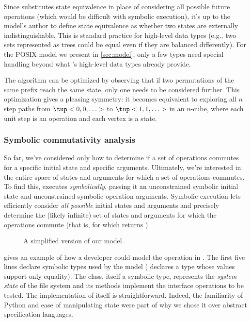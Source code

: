 Since  substitutes state equivalence in place of
considering all possible future operations (which would be difficult
with symbolic execution), it's up to the model's author to define
state equivalence as whether two states are externally
indistinguishable.  This is standard practice for high-level data
types (e.g., two sets represented as trees could be equal even if they
are balanced differently).  For the POSIX model we present in
\cref{sec:model}, only a few types need special handling beyond what
\analyzer's high-level data types already provide.

The  algorithm can be optimized by observing that if
two permutations of the same prefix reach the same state, only one
needs to be considered further.  This optimization gives
 a pleasing symmetry: it becomes equivalent to
exploring all $n$ step paths from $\tup<0,0,\ldots>$ to
$\tup<1,1,\ldots>$ in an $n$-cube, where each unit step is an
operation and each vertex is a state.


\subsubsection{Symbolic commutativity analysis}

So far, we've considered only how to determine if a set of operations
commutes for a specific initial state and specific arguments.
Ultimately, we're interested in the entire space of states and
arguments for which a set of operations commutes.  To find this,
\analyzer executes  \emph{symbolically}, passing it an
unconstrained symbolic initial state and unconstrained symbolic
operation arguments.  Symbolic execution lets \analyzer efficiently
consider \emph{all possible} initial states and arguments and
precisely determine the (likely infinite) set of states and arguments
for which the operations commute (that is, for which 
returns ).

\begin{figure}
  \caption{A simplified version of our  model.}
  \label{fig:rename-spec}
\end{figure}

 gives an example of how a developer could model
the  operation in \analyzer.  The first five lines
declare symbolic types used by the model (
declares a type whose values support only equality).  The 
class, itself a symbolic type, represents the \emph{system state} of
the file system and its methods implement the interface operations to
be tested.  The implementation of  itself is
straightforward.  Indeed, the familiarity of Python and ease of
manipulating state were part of why we chose it over abstract
specification languages.

